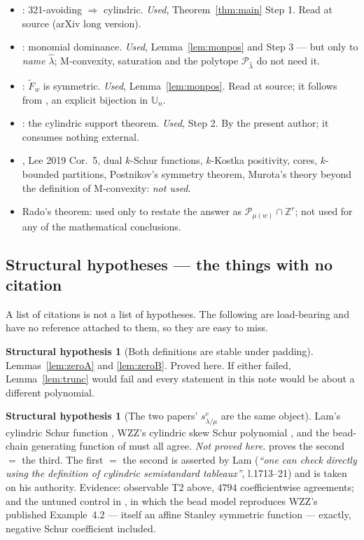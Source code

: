 \documentclass[11pt]{article}
\theoremstyle{plain}
\theoremstyle{definition}
\newtheorem{hyp}[thm]{Structural hypothesis}
\newcommand{\Z}{\mathbb{Z}}
\newcommand{\Fw}{\widetilde{F}_{w}}
\newcommand{\Perm}{\mathcal{P}}
\begin{document}
\begin{itemize}
\item \cite[\texttt{thm:321}]{Lam2006}: 321-avoiding $\Rightarrow$ cylindric. \emph{Used},
Theorem~\ref{thm:main} Step 1. Read at source (arXiv long version).
\item \cite[\texttt{thm:monomial}]{Lam2006}: monomial dominance. \emph{Used},
Lemma~\ref{lem:monpos} and Step 3 --- but only to \emph{name} $\hat\lambda$; M-convexity,
saturation and the polytope $\Perm_{\hat\lambda}$ do not need it.
\item \cite[\texttt{thm:sym}]{Lam2006}: $\Fw$ is symmetric. \emph{Used}, Lemma~\ref{lem:monpos}.
Read at source; it follows from \cite[\texttt{prop:commute}]{Lam2006}, an explicit bijection in
$\mathbb U_n$.
\item \cite[Thm.~7.1]{Clio2026}: the cylindric support theorem. \emph{Used}, Step 2. By the
present author; it consumes nothing external.
\item \cite[Cor.~8.5]{Lam2008}, Lee 2019 Cor.~5, dual $k$-Schur functions, $k$-Kostka
positivity, cores, $k$-bounded partitions, Postnikov's symmetry theorem, Murota's theory beyond
the definition of M-convexity: \emph{not used}.
\item Rado's theorem: used only to restate the answer as $\Perm_{\mu(w)}\cap\Z^r$; not used for
any of the mathematical conclusions.
\end{itemize}

\subsection{Structural hypotheses --- the things with no citation}

A list of citations is not a list of hypotheses. The following are load-bearing and have no
reference attached to them, so they are easy to miss.

\begin{hyp}[Both definitions are stable under padding]
Lemmas~\ref{lem:zeroA} and \ref{lem:zeroB}. Proved here. If either failed,
Lemma~\ref{lem:trunc} would fail and every statement in this note would be about a different
polynomial.
\end{hyp}

\begin{hyp}[The two papers' $s^{c}_{\lambda/\mu}$ are the same object]
Lam's cylindric Schur function \cite[\S7]{Lam2006}, WZZ's cylindric skew Schur polynomial
\cite[\S5]{WZZ}, and the bead-chain generating function of \cite[\S2]{Clio2026} must all
agree. \emph{Not proved here.} \cite[Prop.~2.2]{Clio2026} proves the second $=$ the third.
The first $=$ the second is asserted by Lam (\emph{``one can check directly using the
definition of cylindric semistandard tableaux''}, l.1713--21) and is taken on his authority.
Evidence: observable T2 above, $4794$ coefficientwise agreements; and the untuned control in
\cite[\S9]{Clio2026}, in which the bead model reproduces WZZ's published Example~4.2 ---
itself an affine Stanley symmetric function --- exactly, negative Schur coefficient included.
\end{hyp}
\end{document}
